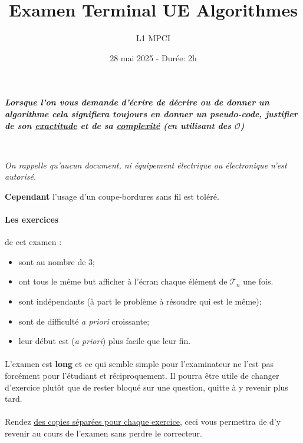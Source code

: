 \documentclass{article}
\title{Examen Terminal UE Algorithmes}
\author{L1 MPCI}
\date{28 mai 2025 - Durée: 2h}
\theoremstyle{exostyle}
\theoremstyle{partiestyle}
\theoremstyle{questionstyle}
\begin{document}
\maketitle

\begin{center}
{\em\bf Lorsque l'on vous demande d'écrire de décrire ou de donner un algorithme cela signifiera toujours en donner un pseudo-code, justifier de son \underline{exactitude} et de sa \underline{complexité} (en utilisant des $\mathcal{O}$)}

~\\

{\em On rappelle qu'aucun document, ni équipement électrique ou électronique n'est autorisé.

 {\bf Cependant} l'usage d'un coupe-bordures sans fil est toléré.}
\end{center}


\vspace*{1cm}

\paragraph{Les exercices} de cet examen : 
\begin{itemize}
\item sont au nombre de 3;
\item ont tous le même but afficher à l'écran chaque élément de $\mathcal{T}_n$ une fois.
\item sont indépendants (à part le problème à résoudre qui est le même);
\item sont de difficulté {\it a priori} croissante;
\item leur début est ({\it a priori}) plus facile que leur fin.
\end{itemize}

\paragraph{}{L'examen est {\bf long} et ce qui semble simple pour l'examinateur ne l'est pas forcément pour l'étudiant et réciproquement. Il pourra être utile de changer d'exercice plutôt que de rester bloqué sur une question, quitte à y revenir plus tard.}

\paragraph{}{\sc Rendez \underline{des copies séparées pour chaque exercice}, ceci vous permettra de d'y revenir au cours de l'examen sans perdre le correcteur.}
\end{document}
